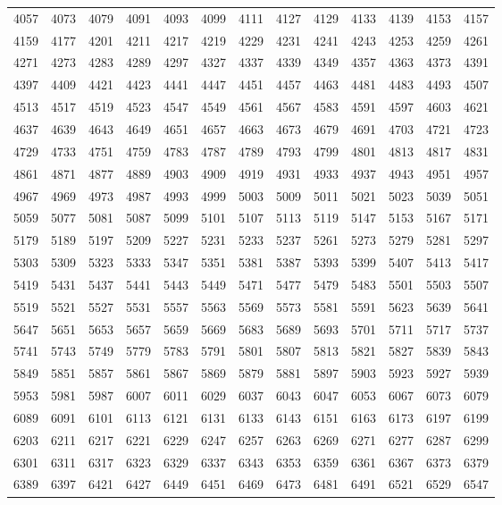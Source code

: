 \documentclass[12pt, a4paper]{article}
\begin{document}
\begin{longtable}{lllll lllll lll}
4057 &4073 &4079 &4091 &4093 &4099 &4111 &4127 &4129 &4133 &4139 &4153 &4157 \\
4159 &4177 &4201 &4211 &4217 &4219 &4229 &4231 &4241 &4243 &4253 &4259 &4261 \\
4271 &4273 &4283 &4289 &4297 &4327 &4337 &4339 &4349 &4357 &4363 &4373 &4391 \\
4397 &4409 &4421 &4423 &4441 &4447 &4451 &4457 &4463 &4481 &4483 &4493 &4507 \\
4513 &4517 &4519 &4523 &4547 &4549 &4561 &4567 &4583 &4591 &4597 &4603 &4621 \\
4637 &4639 &4643 &4649 &4651 &4657 &4663 &4673 &4679 &4691 &4703 &4721 &4723 \\
4729 &4733 &4751 &4759 &4783 &4787 &4789 &4793 &4799 &4801 &4813 &4817 &4831 \\
4861 &4871 &4877 &4889 &4903 &4909 &4919 &4931 &4933 &4937 &4943 &4951 &4957 \\
4967 &4969 &4973 &4987 &4993 &4999 &5003 &5009 &5011 &5021 &5023 &5039 &5051 \\
5059 &5077 &5081 &5087 &5099 &5101 &5107 &5113 &5119 &5147 &5153 &5167 &5171 \\
5179 &5189 &5197 &5209 &5227 &5231 &5233 &5237 &5261 &5273 &5279 &5281 &5297 \\
5303 &5309 &5323 &5333 &5347 &5351 &5381 &5387 &5393 &5399 &5407 &5413 &5417 \\
5419 &5431 &5437 &5441 &5443 &5449 &5471 &5477 &5479 &5483 &5501 &5503 &5507 \\
5519 &5521 &5527 &5531 &5557 &5563 &5569 &5573 &5581 &5591 &5623 &5639 &5641 \\
5647 &5651 &5653 &5657 &5659 &5669 &5683 &5689 &5693 &5701 &5711 &5717 &5737 \\
5741 &5743 &5749 &5779 &5783 &5791 &5801 &5807 &5813 &5821 &5827 &5839 &5843 \\
5849 &5851 &5857 &5861 &5867 &5869 &5879 &5881 &5897 &5903 &5923 &5927 &5939 \\
5953 &5981 &5987 &6007 &6011 &6029 &6037 &6043 &6047 &6053 &6067 &6073 &6079 \\
6089 &6091 &6101 &6113 &6121 &6131 &6133 &6143 &6151 &6163 &6173 &6197 &6199 \\
6203 &6211 &6217 &6221 &6229 &6247 &6257 &6263 &6269 &6271 &6277 &6287 &6299 \\
6301 &6311 &6317 &6323 &6329 &6337 &6343 &6353 &6359 &6361 &6367 &6373 &6379 \\
6389 &6397 &6421 &6427 &6449 &6451 &6469 &6473 &6481 &6491 &6521 &6529 &6547 \\

\end{longtable}
\end{document}
